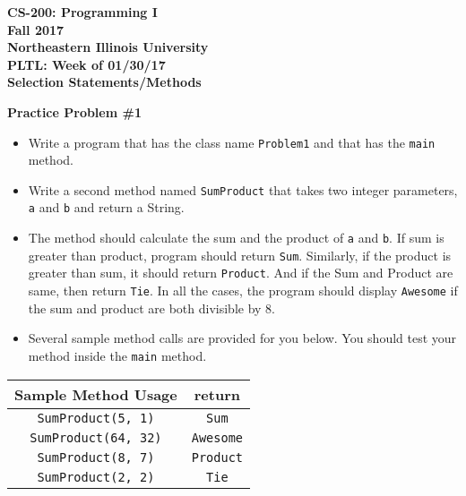 \documentclass[12pt]{article}
\begin{document}
\begin{center}
	\textbf{CS-200: Programming I}\\
	\textbf{Fall 2017}\\
	\textbf{Northeastern Illinois University}\\
	\textbf{PLTL: Week of 01/30/17}\\
	\textbf{Selection Statements/Methods}
\end{center}

\noindent\textbf{Practice Problem \#1}
\begin{itemize}
	\item Write a program that has the class name \texttt{Problem1} and that has the \texttt{main} method.
	\item Write a second method named \texttt{SumProduct} that takes two integer parameters, \texttt{a} and \texttt{b} and return a String.
	\item The method should calculate the sum and the product  of \texttt{a} and \texttt{b}. If sum is greater than product, program should return \texttt{Sum}. Similarly, if the product is greater than sum, it should return \texttt{Product}. And if the Sum and Product are same, then return \texttt{Tie}. In all the cases, the program should display \texttt{Awesome} if the sum and product are both divisible by 8.
	\item Several sample method calls are provided for you below. You should test your method inside the \texttt{main} method.
\end{itemize}
\begin{center}
\begin{tabular}{| c | c |}
\hline\rule{0pt}{4ex}
Sample Method Usage & return \\
\hline\rule{0pt}{4ex}
\texttt{SumProduct(5, 1)} & \texttt{Sum}\\
\hline\rule{0pt}{4ex}
\texttt{SumProduct(64, 32)} & \texttt{Awesome}\\
\hline\rule{0pt}{4ex}
\texttt{SumProduct(8, 7)} & \texttt{Product}\\
\hline\rule{0pt}{4ex}
\texttt{SumProduct(2, 2)} & \texttt{Tie}\\
\hline
\end{tabular}
\end{center}
\end{document}
